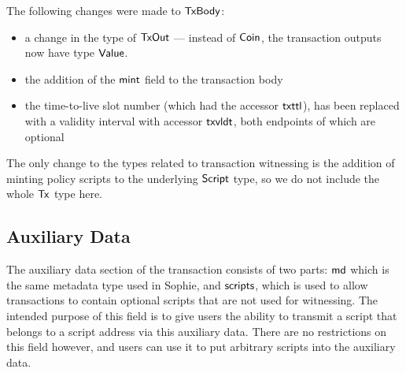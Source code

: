 The following changes were made to $\mathsf{TxBody}$:

\begin{itemize}
  \item a change in the type of $\mathsf{TxOut}$ --- instead of
$\mathsf{Coin}$, the transaction outputs now have type $\mathsf{Value}$.
  \item the addition of the $\mathsf{mint}$ field to the transaction body
  \item the time-to-live slot number (which had the accessor $\mathsf{txttl}$),
  has been replaced with a validity interval with accessor $\mathsf{txvldt}$,
  both endpoints of which are optional
\end{itemize}

The only change to the types related to transaction witnessing is the addition
of minting policy scripts to the underlying $\mathsf{Script}$ type, so we do not include the
whole $\mathsf{Tx}$ type here.

\subsection*{Auxiliary Data}

The auxiliary data section of the transaction consists of two parts:
$\mathsf{md}$ which is the same metadata type used in
Sophie, and $\mathsf{scripts}$, which is used to allow transactions to
contain optional scripts that are not used for witnessing. The
intended purpose of this field is to give users the ability to
transmit a script that belongs to a script address via this
auxiliary data. There are no restrictions on this field however, and users
can use it to put arbitrary scripts into the auxiliary data.
